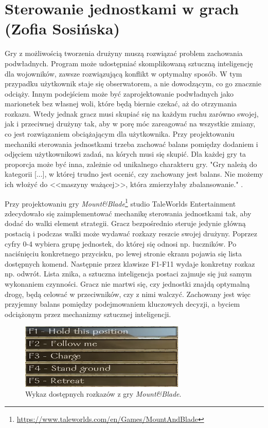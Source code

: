 \section{Sterowanie jednostkami w grach (Zofia Sosińska)}\label{chap:mb}
Gry z możliwością tworzenia drużyny muszą rozwiązać problem zachowania podwładnych. Program może udostępniać
skomplikowaną sztuczną inteligencję dla wojowników, zawsze rozwiązującą konflikt w optymalny sposób. W tym przypadku
użytkownik staje się obserwatorem, a nie dowodzącym, co go znacznie odciąży. Innym podejściem może być zaprojektowanie podwładnych jako 
marionetek bez własnej woli, które będą biernie czekać, aż do otrzymania rozkazu. Wtedy jednak gracz musi skupiać się na 
każdym ruchu zarówno swojej, jak i przeciwnej drużyny tak, aby w porę móc zareagować na wszystkie zmiany, co
jest rozwiązaniem obciążającym dla użytkownika. Przy projektowaniu mechaniki sterowania jednostkami trzeba zachować balans pomiędzy 
dodaniem i odjęciem użytkownikowi zadań, na kórych musi się skupić. Dla każdej gry ta proporcja może być inna, zależnie
od unikalnego charakteru gry. "Gry należą do kategorii [...], w której trudno jest ocenić, czy zachowany jest balans.
 Nie możemy ich włożyć do <<maszyny ważącej>>, która zmierzyłaby zbalansowanie." \cite{balancing_game}.

Przy projektowaniu gry \textit{Mount\&Blade}\footnote{\url{https://www.taleworlds.com/en/Games/MountAndBlade}} studio TaleWorlds Entertainment zdecydowało się zaimplementować mechanikę sterowania jednostkami tak, aby
dodać do walki element strategii. Gracz bezpośrednio steruje jedynie główną postacią i podczas walki może wydawać rozkazy reszcie swojej drużyny. Poprzez
cyfry 0-4 wybiera grupę jednostek, do której się odnosi np. łuczników. Po naciśnięciu konkretnego przycisku, po lewej stronie ekranu pojawia się lista dostępnych komend.
Następnie przez klawisze F1-F11 wydaje konkretny rozkaz np. odwrót. Lista znika, a sztuczna inteligencja postaci zajmuje się już samym wykonaniem czynności.
Gracz nie martwi się, czy jednostki znajdą optymalną drogę, 
będą celować w przeciwników, czy z nimi walczyć. Zachowany jest więc przyjemny balans pomiędzy podejmowaniem kluczowych decyzji, a byciem odciążonym przez mechanizmy sztucznej inteligencji.

\begin{figure}[h!tbp]
    \centering
    \includegraphics[width=0.7\textwidth]{images/ui/commandsMountBla.png}
    \caption{Wykaz dostępnych rozkazów z gry \textit{Mount\&Blade}\protect\footnotemark.}\label{fig:MountnBlade}
    \label{fig:mnb}
\end{figure}
